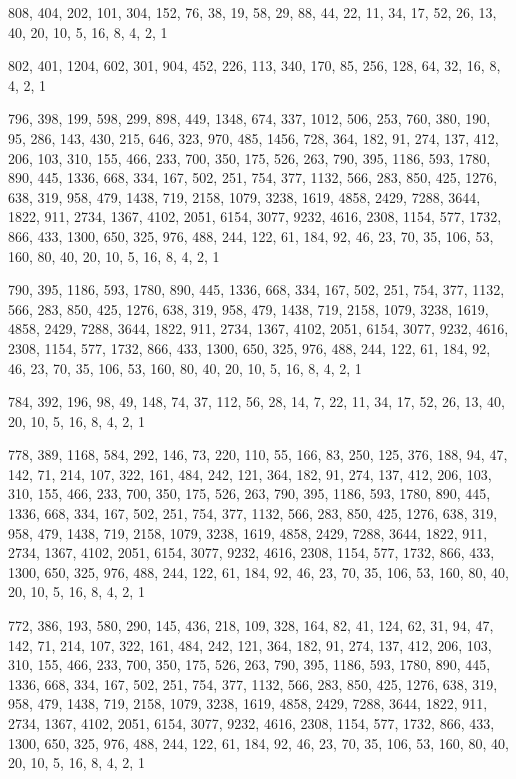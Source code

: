 \documentclass[12pt]{article}
\begin{document}
808, 404, 202, 101, 304, 152, 76, 38, 19, 58, 29, 88, 44, 22, 11, 34, 17, 52, 26, 13, 40, 20, 10, 5, 16, 8, 4, 2, 1

802, 401, 1204, 602, 301, 904, 452, 226, 113, 340, 170, 85, 256, 128, 64, 32, 16, 8, 4, 2, 1

796, 398, 199, 598, 299, 898, 449, 1348, 674, 337, 1012, 506, 253, 760, 380, 190, 95, 286, 143, 430, 215, 646, 323, 970, 485, 1456, 728, 364, 182, 91, 274, 137, 412, 206, 103, 310, 155, 466, 233, 700, 350, 175, 526, 263, 790, 395, 1186, 593, 1780, 890, 445, 1336, 668, 334, 167, 502, 251, 754, 377, 1132, 566, 283, 850, 425, 1276, 638, 319, 958, 479, 1438, 719, 2158, 1079, 3238, 1619, 4858, 2429, 7288, 3644, 1822, 911, 2734, 1367, 4102, 2051, 6154, 3077, 9232, 4616, 2308, 1154, 577, 1732, 866, 433, 1300, 650, 325, 976, 488, 244, 122, 61, 184, 92, 46, 23, 70, 35, 106, 53, 160, 80, 40, 20, 10, 5, 16, 8, 4, 2, 1

790, 395, 1186, 593, 1780, 890, 445, 1336, 668, 334, 167, 502, 251, 754, 377, 1132, 566, 283, 850, 425, 1276, 638, 319, 958, 479, 1438, 719, 2158, 1079, 3238, 1619, 4858, 2429, 7288, 3644, 1822, 911, 2734, 1367, 4102, 2051, 6154, 3077, 9232, 4616, 2308, 1154, 577, 1732, 866, 433, 1300, 650, 325, 976, 488, 244, 122, 61, 184, 92, 46, 23, 70, 35, 106, 53, 160, 80, 40, 20, 10, 5, 16, 8, 4, 2, 1

784, 392, 196, 98, 49, 148, 74, 37, 112, 56, 28, 14, 7, 22, 11, 34, 17, 52, 26, 13, 40, 20, 10, 5, 16, 8, 4, 2, 1

778, 389, 1168, 584, 292, 146, 73, 220, 110, 55, 166, 83, 250, 125, 376, 188, 94, 47, 142, 71, 214, 107, 322, 161, 484, 242, 121, 364, 182, 91, 274, 137, 412, 206, 103, 310, 155, 466, 233, 700, 350, 175, 526, 263, 790, 395, 1186, 593, 1780, 890, 445, 1336, 668, 334, 167, 502, 251, 754, 377, 1132, 566, 283, 850, 425, 1276, 638, 319, 958, 479, 1438, 719, 2158, 1079, 3238, 1619, 4858, 2429, 7288, 3644, 1822, 911, 2734, 1367, 4102, 2051, 6154, 3077, 9232, 4616, 2308, 1154, 577, 1732, 866, 433, 1300, 650, 325, 976, 488, 244, 122, 61, 184, 92, 46, 23, 70, 35, 106, 53, 160, 80, 40, 20, 10, 5, 16, 8, 4, 2, 1

772, 386, 193, 580, 290, 145, 436, 218, 109, 328, 164, 82, 41, 124, 62, 31, 94, 47, 142, 71, 214, 107, 322, 161, 484, 242, 121, 364, 182, 91, 274, 137, 412, 206, 103, 310, 155, 466, 233, 700, 350, 175, 526, 263, 790, 395, 1186, 593, 1780, 890, 445, 1336, 668, 334, 167, 502, 251, 754, 377, 1132, 566, 283, 850, 425, 1276, 638, 319, 958, 479, 1438, 719, 2158, 1079, 3238, 1619, 4858, 2429, 7288, 3644, 1822, 911, 2734, 1367, 4102, 2051, 6154, 3077, 9232, 4616, 2308, 1154, 577, 1732, 866, 433, 1300, 650, 325, 976, 488, 244, 122, 61, 184, 92, 46, 23, 70, 35, 106, 53, 160, 80, 40, 20, 10, 5, 16, 8, 4, 2, 1
\end{document}
